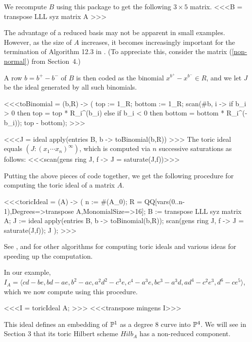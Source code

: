 We recompute $B$ using this package to get the following $3 \times 5$ matrix.
<<<B = transpose LLL syz matrix A >>>

The advantage of a reduced basis may not be apparent in small
examples. However, as the size of $A$ increases, it becomes
increasingly important for the termination of Algorithm 12.3 in \cite{HS:St2}. (To
appreciate this, consider the matrix (\ref{non-normal}) from 
Section~4.)

A row $b = b^+ - b^-$ of $B$ is then coded as the binomial
$x^{b^+}-x^{b^-} \in R$, and we let $J$ be the ideal generated by all 
such binomials. 

<<<toBinomial = (b,R) -> (
     top := 1_R; bottom := 1_R;
     scan(#b, i -> if b_i > 0 then top = top * R_i^(b_i)
          else if b_i < 0 then bottom = bottom * R_i^(-b_i));
     top - bottom); >>>

<<<J = ideal apply(entries B, b -> toBinomial(b,R)) >>>
The toric ideal equals $(J : (x_1 \cdots x_n)^\infty)$, which is 
computed via $n$ successive saturations as follows:
<<<scan(gens ring J, f -> J = saturate(J,f))>>>

Putting the above pieces of code together, we get the following
procedure for computing the toric ideal of a matrix $A$.

<<<toricIdeal = (A) -> (
    n := #(A_0);  
    R = QQ[vars(0..n-1),Degrees=>transpose A,MonomialSize=>16]; 
    B := transpose LLL syz matrix A;
    J := ideal apply(entries B, b -> toBinomial(b,R));
    scan(gens ring J, f -> J = saturate(J,f));
    J
    ); >>>

See \cite{HS:BLR}, \cite{HS:HS} and \cite[\S 4, \S 12]{HS:St2} for other
algorithms for computing toric ideals and various ideas for
speeding up the computation.

In our example, $I_A = \langle
cd-be,bd-ae,b^2-ac,a^2d^2-c^3e,c^4-a^3e,bc^3-a^3d,
ad^4-c^2e^3,d^6-ce^5 \rangle$, which we now compute using this
procedure.  

<<<I = toricIdeal A; >>> 
<<<transpose mingens I>>>

This ideal defines an embedding of
$\P^1$ as a degree $8$ curve into $\P^4$. We will see in Section 3
that its toric Hilbert scheme $Hilb_A$ has a non-reduced component.


